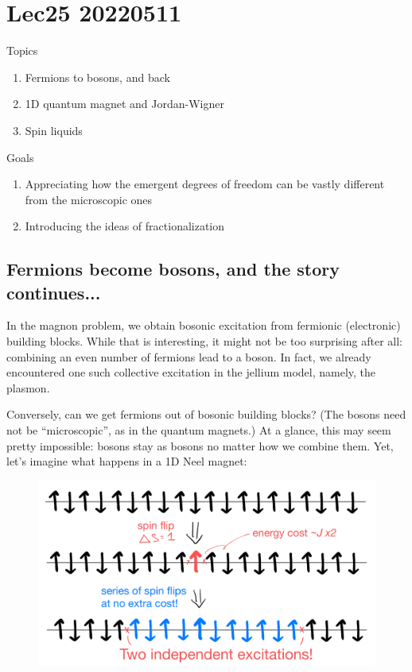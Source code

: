 \chapter{Lec25 20220511}

Topics

\begin{enumerate}
    \item Fermions to bosons, and back
    \item 1D quantum magnet and Jordan-Wigner
    \item Spin liquids
\end{enumerate}

Goals

\begin{enumerate}
    \item Appreciating how the emergent degrees of freedom can be vastly different from the microscopic ones
    \item Introducing the ideas of fractionalization
\end{enumerate}

\section{Fermions become bosons, and the story continues...}

In the magnon problem, we obtain bosonic excitation from fermionic (electronic) building blocks. While that is interesting, it might not be too surprising after all: combining an even number of fermions lead to a boson. In fact, we already encountered one such collective excitation in the jellium model, namely, the plasmon.

Conversely, can we get fermions out of bosonic building blocks? (The bosons need not be ``microscopic'', as in the quantum magnets.) At a glance, this may seem pretty impossible: bosons stay as bosons no matter how we combine them. Yet, let's imagine what happens in a 1D Neel magnet:
\begin{figure}[H]
    \centering
    \includegraphics[width=\textwidth]{jupyterbook/data/fig/lec26-fig00.png}
\end{figure}


